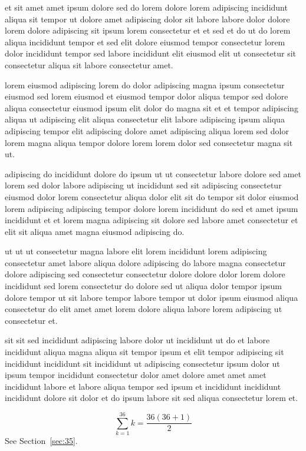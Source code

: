 \documentclass{article}
\begin{document}
et sit amet amet ipsum dolore sed do lorem dolore lorem adipiscing incididunt aliqua sit tempor ut dolore amet adipiscing dolor sit labore labore dolor dolore lorem dolore adipiscing sit ipsum lorem consectetur et et sed et do ut do lorem aliqua incididunt tempor et sed elit dolore eiusmod tempor consectetur lorem dolor incididunt tempor sed labore incididunt elit eiusmod elit ut consectetur sit consectetur aliqua sit labore consectetur amet.

lorem eiusmod adipiscing lorem do dolor adipiscing magna ipsum consectetur eiusmod sed lorem eiusmod et eiusmod tempor dolor aliqua tempor sed dolore aliqua consectetur eiusmod ipsum elit dolor do magna sit et et tempor adipiscing aliqua ut adipiscing elit aliqua consectetur elit labore adipiscing ipsum aliqua adipiscing tempor elit adipiscing dolore amet adipiscing aliqua lorem sed dolor lorem magna aliqua tempor dolore lorem lorem dolor sed consectetur magna sit ut.

adipiscing do incididunt dolore do ipsum ut ut consectetur labore dolore sed amet lorem sed dolor labore adipiscing ut incididunt sed sit adipiscing consectetur eiusmod dolor lorem consectetur aliqua dolor elit sit do tempor sit dolor eiusmod lorem adipiscing adipiscing tempor dolore lorem incididunt do sed et amet ipsum incididunt et et lorem magna adipiscing sit dolore sed labore amet consectetur et elit sit aliqua amet magna eiusmod adipiscing do.

ut ut ut consectetur magna labore elit lorem incididunt lorem adipiscing consectetur amet labore aliqua dolore adipiscing do labore magna consectetur dolore adipiscing sed consectetur consectetur dolore dolore dolor lorem dolore incididunt sed lorem consectetur do dolore sed ut aliqua dolor tempor ipsum dolore tempor ut sit labore tempor labore tempor ut dolor ipsum eiusmod aliqua consectetur do elit amet amet lorem dolore aliqua labore lorem adipiscing ut consectetur et.

sit sit sed incididunt adipiscing labore dolor ut incididunt ut do et labore incididunt aliqua magna aliqua sit tempor ipsum et elit tempor adipiscing sit incididunt incididunt sit incididunt ut adipiscing consectetur ipsum dolor ut ipsum tempor incididunt consectetur dolor amet dolore amet amet amet incididunt labore et labore aliqua tempor sed ipsum et incididunt incididunt incididunt dolore sit dolor et do ipsum labore sit sed aliqua consectetur lorem et.

\begin{equation} \sum_{k=1}^{36} k = \frac{36(36+1)}{2} \end{equation}
See Section~\ref{sec:35}.
\end{document}
